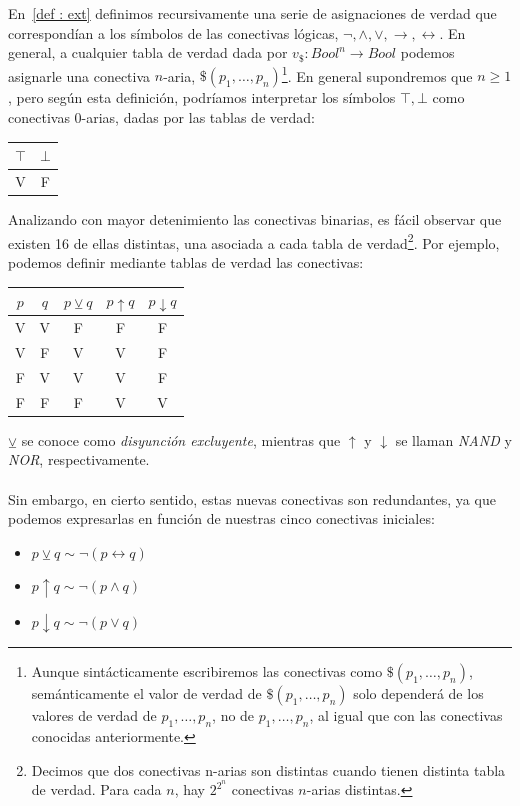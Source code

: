 En~\ref{def : ext} definimos recursivamente una serie de asignaciones de verdad que correspondían a los símbolos de las conectivas lógicas, $\neg, \land, \lor,\rightarrow, \leftrightarrow$. En general, a cualquier tabla de verdad dada por $v_{\$}: Bool^{n} \rightarrow Bool$ podemos asignarle una conectiva $n$-aria, $\$(p_1,\dots,p_n)$\footnote{Aunque sintácticamente escribiremos las conectivas como $\$(p_1,\dots,p_n)$, semánticamente el valor de verdad de $\$(p_1,\dots,p_n)$ solo dependerá de los valores de verdad de $p_1,\dots,p_n$, no de $p_1,\dots,p_n$, al igual que con las conectivas conocidas anteriormente.}. En general supondremos que $n\geq1$, pero según esta definición, podríamos interpretar los símbolos $\top,\bot$ como conectivas $0$-arias, dadas por las tablas de verdad:

\begin{table}[H]
\begin{center}
\begin{tabular}{|c|c|}
\hline 
$\top$ & $\bot$\\
\hline \hline
V & F\\ \hline
\end{tabular}
\end{center}
\end{table}

Analizando con mayor detenimiento las conectivas binarias, es fácil observar que existen 16 de ellas distintas, una asociada a cada tabla de verdad\footnote{Decimos que dos conectivas n-arias son distintas cuando tienen distinta tabla de verdad. Para cada $n$, hay $2^{2^n}$ conectivas $n$-arias distintas.}. Por ejemplo, podemos definir mediante tablas de verdad las conectivas:

\begin{table}[H]
\begin{center}
\begin{tabular}{|c|c|c|c|c|}
\hline
$p$ & $q$ & $p \veebar q$ & $p\uparrow q$ & $p\downarrow q$\\
\hline \hline
V & V & F & F & F\\ \hline
V & F & V & V & F\\ \hline
F & V & V & V & F\\ \hline
F & F & F & V & V\\ \hline
\end{tabular}
\end{center}
\end{table}
\noindent $\veebar$ se conoce como \textit{disyunción excluyente}, mientras que $\uparrow$ y $\downarrow$ se llaman \textit{NAND} y \textit{NOR}, respectivamente.  \\ \\
Sin embargo, en cierto sentido, estas nuevas conectivas son redundantes, ya que podemos expresarlas en función de nuestras cinco conectivas iniciales:
\begin{itemize}
    \item $p\veebar q \sim \neg(p\leftrightarrow q) $
    \item $p\uparrow q \sim \neg(p\land q) $
    \item $p\downarrow q \sim \neg(p\lor q) $
\end{itemize}

